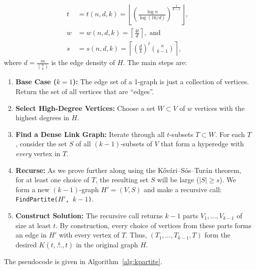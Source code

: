 \documentclass[12pt]{article}
\newcommand{\compoverset}[2]{\ensuremath{K(#2, \overset{#1}{\dots}, #2)}}
\begin{document}
\begin{align*}
    t &= t(n, d, k) = \left\lfloor \left( \frac{\log n}{\log (16/d)}  \right)^{\frac{1}{k-1}} \right \rfloor, \\
    w &= w(n, d, k) = \left\lceil \frac{4 t}{d} \right\rceil, \text{ and } \\
    s &= s(n, d, k) = \left\lceil \left( \frac{d}{4} \right)^t \binom{n}{k-1} \right\rceil,
\end{align*}
where $d = \frac{m}{\binom{n}{k}}$ is the edge density of $H$.
The main steps are:
\begin{enumerate}
    \item \textbf{Base Case ($k=1$):} The edge set of a 1-graph is just a collection of vertices.
    Return the set of all vertices that are ``edges''.

    \item \textbf{Select High-Degree Vertices:} Choose a set $W \subset V$ of $w$ vertices with the highest degrees in $H$.

    \item \textbf{Find a Dense Link Graph:} Iterate through all $t$-subsets $T \subset W$.
    For each $T$, consider the set $S$ of all $(k-1)$-subsets of $V$ that form a hyperedge with \emph{every} vertex in $T$. \label{link}

    \item \textbf{Recurse:} As we prove further along using the Kővári–Sós–Turán theorem, for at least one choice of $T$,
    the resulting set $S$ will be large ($|S| \ge s$). We form a new $(k-1)$-graph $H'=(V, S)$ and make a recursive call: \texttt{FindPartite($H'$, $k-1$)}.

    \item \textbf{Construct Solution:} The recursive call returns $k-1$ parts $V_1, \dots, V_{k-1}$ of size at least $t$.
    By construction, every choice of vertices from these parts forms an edge in $H'$ with every vertex of $T$.
    Thus, $(T_1, \dots, T_{k-1}, T)$ form the desired $\compoverset{k}{t}$ in the original graph $H$.

\end{enumerate}

The pseudocode is given in Algorithm~\ref{alg:kpartite}.
\end{document}
